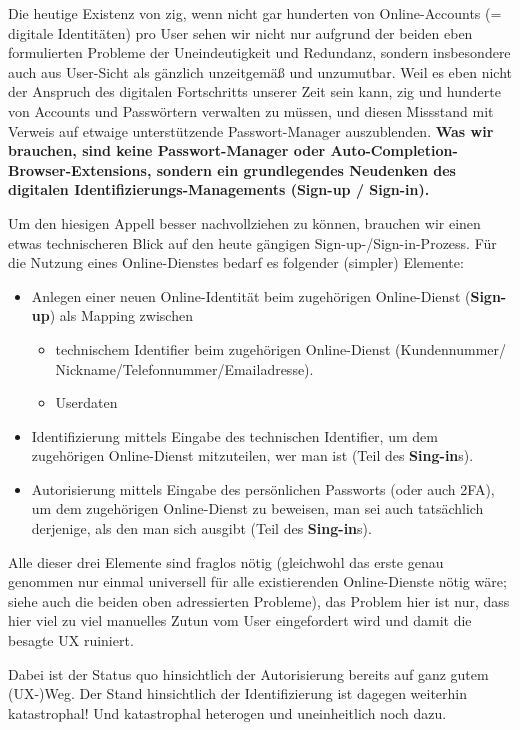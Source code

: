 \begin{Problem}[mangelhafte UX]

Die heutige Existenz von zig, wenn nicht gar hunderten von Online-Accounts (= digitale Identitäten) pro User sehen wir nicht nur aufgrund der beiden eben formulierten Probleme der Uneindeutigkeit und Redundanz, sondern insbesondere auch aus User-Sicht als gänzlich unzeitgemäß und unzumutbar. Weil es eben nicht der Anspruch des digitalen Fortschritts unserer Zeit sein kann, zig und hunderte von Accounts und Passwörtern verwalten zu müssen, und diesen Missstand mit Verweis auf etwaige unterstützende Passwort-Manager auszublenden. \textbf{Was wir brauchen, sind keine Passwort-Manager oder Auto-Completion-Browser-Extensions, sondern ein grundlegendes Neudenken des digitalen Identifizierungs-Managements (Sign-up / Sign-in).}

\vspace{0.2cm}

Um den hiesigen Appell besser nachvollziehen zu können, brauchen wir einen etwas technischeren Blick auf den heute gängigen Sign-up-/Sign-in-Prozess. Für die Nutzung eines Online-Dienstes bedarf es folgender (simpler) Elemente:

\begin{itemize}
  \item Anlegen einer neuen Online-Identität beim zugehörigen Online-Dienst (\textbf{Sign-up}) als Mapping zwischen
  \begin{itemize}
  	\item technischem Identifier beim zugehörigen Online-Dienst (Kundennummer/
  	\newline Nickname/Telefonnummer/Emailadresse).
  	\item Userdaten
  \end{itemize}
  \item Identifizierung mittels Eingabe des technischen Identifier, um dem zugehörigen Online-Dienst mitzuteilen, wer man ist (Teil des \textbf{Sing-in}s).
  \item Autorisierung mittels Eingabe des persönlichen Passworts (oder auch 2FA), um dem zugehörigen Online-Dienst zu beweisen, man sei auch tatsächlich derjenige, als den man sich ausgibt (Teil des \textbf{Sing-in}s).
\end{itemize}

Alle dieser drei Elemente sind fraglos nötig (gleichwohl das erste genau genommen nur einmal universell für alle existierenden Online-Dienste nötig wäre; siehe auch die beiden oben adressierten Probleme), das Problem hier ist nur, dass hier viel zu viel manuelles Zutun vom User eingefordert wird und damit die besagte UX ruiniert. 

Dabei ist der Status quo hinsichtlich der Autorisierung bereits auf ganz gutem (UX-)Weg. Der Stand hinsichtlich der Identifizierung ist dagegen weiterhin katastrophal! Und katastrophal heterogen und uneinheitlich noch dazu.

\end{Problem}

